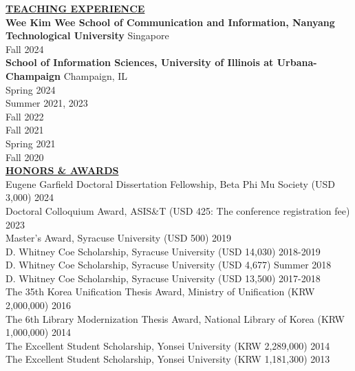 \documentclass{article}
\begin{document}
\noindent \textbf{\underline{TEACHING EXPERIENCE}} \\
\noindent \textbf{Wee Kim Wee School of Communication and Information, Nanyang Technological University} \hfill Singapore \\
 \hfill Fall 2024 \\

\noindent \textbf{School of Information Sciences, University of Illinois at Urbana-Champaign} \hfill Champaign, IL \\
 \hfill Spring 2024 \\
 \hfill Summer 2021, 2023 \\
 \hfill Fall 2022 \\
 \hfill Fall 2021 \\
 \hfill Spring 2021 \\
 \hfill Fall 2020 \\


\noindent \textbf{\underline{HONORS \& AWARDS}} \\
\noindent Eugene Garfield Doctoral Dissertation Fellowship, Beta Phi Mu Society (USD 3,000) \hfill 2024 \\
\noindent Doctoral Colloquium Award, ASIS\&T (USD 425: The conference registration fee) \hfill 2023 \\
\noindent Master's Award, Syracuse University (USD 500) \hfill 2019 \\
\noindent D. Whitney Coe Scholarship, Syracuse University (USD 14,030) \hfill 2018-2019 \\
\noindent D. Whitney Coe Scholarship, Syracuse University (USD 4,677) \hfill Summer 2018 \\
\noindent D. Whitney Coe Scholarship, Syracuse University (USD 13,500) \hfill 2017-2018 \\
\noindent The 35th Korea Unification Thesis Award, Ministry of Unification (KRW 2,000,000) \hfill 2016 \\
\noindent The 6th Library Modernization Thesis Award, National Library of Korea (KRW 1,000,000) \hfill 2014 \\
\noindent The Excellent Student Scholarship, Yonsei University (KRW 2,289,000)
\hfill 2014 \\
\noindent The Excellent Student Scholarship, Yonsei University (KRW 1,181,300) \hfill 2013 \\
\end{document}
